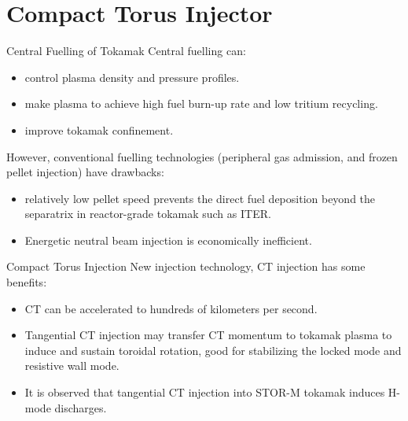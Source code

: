 \section{Compact Torus Injector}
\begin{frame} {Central Fuelling of Tokamak}
    Central fuelling can:
    \begin{itemize}
        \item control plasma density and pressure profiles.
        \item make plasma to achieve high fuel burn-up rate and low tritium recycling.
        \item improve tokamak confinement.
    \end{itemize}

    However, conventional fuelling technologies (peripheral gas admission, and frozen pellet injection) have drawbacks:
    \begin{itemize}
        \item relatively low pellet speed prevents the direct fuel deposition beyond the separatrix in reactor-grade tokamak such as ITER.
        \item Energetic neutral beam injection is economically inefficient.
    \end{itemize}
\end{frame}

\begin{frame} {Compact Torus Injection}
    New injection technology, CT injection has some benefits:
    \begin{itemize}
        \item CT can be accelerated to hundreds of kilometers per second.
        \item Tangential CT injection may transfer CT momentum to tokamak plasma to induce and sustain toroidal rotation, good for stabilizing the locked mode and resistive wall mode.
        \item It is observed that tangential CT injection into STOR-M tokamak induces H-mode discharges.
    \end{itemize}
\end{frame}

